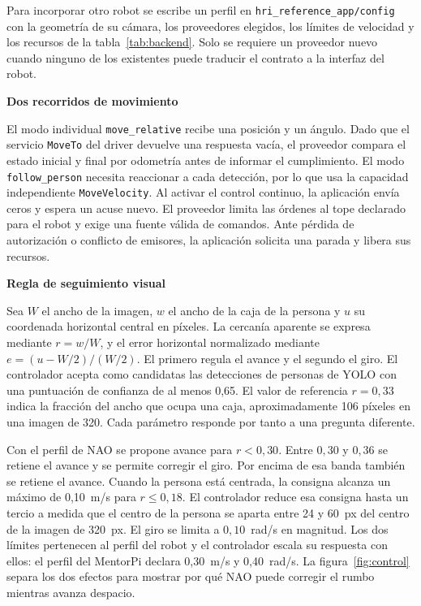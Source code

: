 \documentclass[11pt,letterpaper]{article}
\newcommand{\code}[1]{\nolinkurl{#1}}
\begin{document}
Para incorporar otro robot se escribe un perfil en \code{hri_reference_app/config} con la geometría de su cámara, los proveedores elegidos, los límites de velocidad y los recursos de la tabla~\ref{tab:backend}. Solo se requiere un proveedor nuevo cuando ninguno de los existentes puede traducir el contrato a la interfaz del robot.

\par\medskip\noindent\textbf{Dos recorridos de movimiento}\par
El modo individual \code{move_relative} recibe una posición y un ángulo. Dado que el servicio \code{MoveTo} del driver devuelve una respuesta vacía, el proveedor compara el estado inicial y final por odometría antes de informar el cumplimiento. El modo \code{follow_person} necesita reaccionar a cada detección, por lo que usa la capacidad independiente \code{MoveVelocity}. Al activar el control continuo, la aplicación envía ceros y espera un acuse nuevo. El proveedor limita las órdenes al tope declarado para el robot y exige una fuente válida de comandos. Ante pérdida de autorización o conflicto de emisores, la aplicación solicita una parada y libera sus recursos.

\par\medskip\noindent\textbf{Regla de seguimiento visual}\par
Sea $W$ el ancho de la imagen, $w$ el ancho de la caja de la persona y $u$ su coordenada horizontal central en píxeles. La cercanía aparente se expresa mediante $r=w/W$, y el error horizontal normalizado mediante $e=(u-W/2)/(W/2)$. El primero regula el avance y el segundo el giro. El controlador acepta como candidatas las detecciones de personas de YOLO con una puntuación de confianza de al menos 0,65. El valor de referencia $r=0{,}33$ indica la fracción del ancho que ocupa una caja, aproximadamente 106 píxeles en una imagen de 320. Cada parámetro responde por tanto a una pregunta diferente.

Con el perfil de NAO se propone avance para $r<0{,}30$. Entre $0{,}30$ y $0{,}36$ se retiene el avance y se permite corregir el giro. Por encima de esa banda también se retiene el avance. Cuando la persona está centrada, la consigna alcanza un máximo de 0,10~m/s para $r\leq 0{,}18$. El controlador reduce esa consigna hasta un tercio a medida que el centro de la persona se aparta entre 24 y 60~px del centro de la imagen de 320~px. El giro se limita a $0{,}10$~rad/s en magnitud. Los dos límites pertenecen al perfil del robot y el controlador escala su respuesta con ellos: el perfil del MentorPi declara 0,30~m/s y 0,40~rad/s. La figura~\ref{fig:control} separa los dos efectos para mostrar por qué NAO puede corregir el rumbo mientras avanza despacio.
\end{document}
